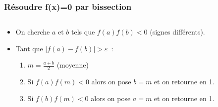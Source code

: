 \documentclass[10pt,notheorems]{beamer}
\theoremstyle{plain}
\theoremstyle{definition} %
\begin{document}
\begin{frame}
  \frametitle{Résoudre f(x)=0 par bissection}

  \begin{columns}[onlytextwidth]
    \begin{column}{.5\textwidth}
      \begin{itemize}

      \item On cherche $a$ et $b$ tels que $f(a)f(b)<0$ (signes différents).\newline

      \item Tant que $|f(a)-f(b)|>\varepsilon$~:\newline

        \begin{enumerate}
        \item $m = \frac{a+b}{2}$ (moyenne)
          \medskip
        \item Si $f(a)f(m)<0$ alors on pose $b = m$ et on retourne en 1.
          \medskip
        \item Si $f(b)f(m)<0$ alors on pose $a = m$ et on retourne en 1.
          \medskip
        \end{enumerate}

      \end{itemize}


\end{column}
\end{columns}
\end{frame}
\end{document}
